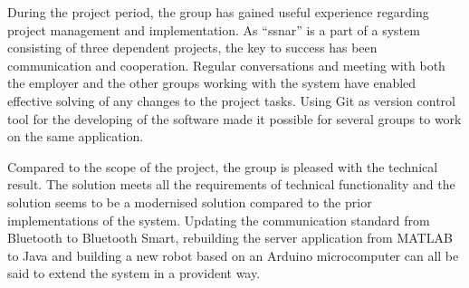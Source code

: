 During the project period, the group has gained useful experience regarding project management and implementation. As ``\acrfull{ssnar}'' is a part of a system consisting of three dependent projects, the key to success has been communication and cooperation. Regular conversations and meeting with both the employer and the other groups working with the system have enabled effective solving of any changes to the project tasks. Using Git as version control tool for the developing of the software made it possible for several groups to work on the same application.

Compared to the scope of the project, the group is pleased with the technical result. The solution meets all the requirements of technical functionality and the solution seems to be a modernised solution compared to the prior implementations of the system. Updating the communication standard from Bluetooth to Bluetooth Smart, rebuilding the server application from MATLAB to Java and building a new robot based on an Arduino microcomputer can all be said to extend the system in a provident way.

\clearpage